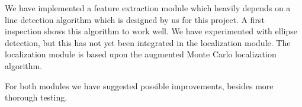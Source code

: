 \documentclass[	DIV=calc,%
							paper=a4,%
							fontsize=9pt,%
							twocolumn]{scrartcl}	 					%
\begin{document}
We have implemented a feature extraction module which heavily depends on a line detection algorithm which is designed by us for this project.  A first inspection shows this algorithm to work well.  We have experimented with ellipse detection, but this has not yet been integrated in the localization module.  The localization module is based upon the augmented Monte Carlo localization algorithm.

For both modules we have suggested possible improvements, besides more thorough testing.

\printbibliography
\end{document}
